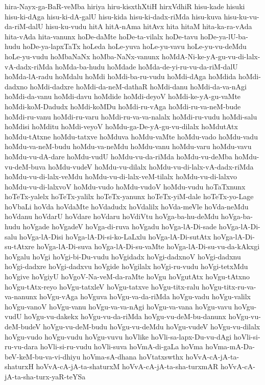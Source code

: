 {hira-Nayx-ga-BaR-veMba
hiriya
hiru-kisxthXtiH
hirxVdhiR
hisu-kade
hisuki
hisu-ki-dAga
hisu-ki-dA-galU
hisu-kida
hisu-ki-dadx-riMda
hisu-kuva
hisu-ku-vu-da-riM-dalU
hisu-ku-vudu
hitA
hitA-nAma
hitAvx
hita
hitaM
hita-ka-ra-vAda
hita-vAda
hita-vanunx
hoDe-daMte
hoDe-ta-vilalx
hoDe-tavu
hoDe-ya-lU-ba-hudu
hoDe-ya-lapxTaTx
hoLeda
hoLe-yuva
hoLe-yu-vavu
hoLe-yu-vu-deMdu
hoLe-yu-vudu
hoMbaNaNx
hoMba-NaNx-vanunx
hoMdA-Ni-ke-yA-gu-vu-di-lalx-vA-dadx-riMda
hoMda-ba-hudu
hoMdade
hoMda-de-yi-ru-vu-da-riM-dalU
hoMda-lA-radu
hoMdalu
hoMdi
hoMdi-ba-ru-vudu
hoMdi-dAga
hoMdida
hoMdi-dadxno
hoMdi-dadxre
hoMdi-da-neM-dathaR
hoMdi-danu
hoMdi-da-va-nAgi
hoMdi-da-vanu
hoMdi-davu
hoMdide
hoMdi-deyoV
hoMdi-ke-yA-gu-vaMte
hoMdi-koM-Dadudx
hoMdi-koMDu
hoMdi-ru-vAga
hoMdi-ru-va-neM-bude
hoMdi-ru-vanu
hoMdi-ru-varu
hoMdi-ru-va-va-nalalx
hoMdi-ru-vudu
hoMdi-salu
hoMdisi
hoMditu
hoMdi-veyoV
hoMdu-ga-De-yA-gu-vu-dilalx
hoMdutAtx
hoMdu-tAtxne
hoMdu-tatxve
hoMduva
hoMdu-vaMte
hoMdu-vado
hoMdu-vadu
hoMdu-va-neM-budu
hoMdu-va-neMdu
hoMdu-vanu
hoMdu-varu
hoMdu-vavu
hoMdu-vu-dA-dare
hoMdu-vudU
hoMdu-vu-da-riMda
hoMdu-vu-deMba
hoMdu-vu-deM-buva
hoMdu-vudeV
hoMdu-vu-dilalx
hoMdu-vu-di-lalx-vA-dadx-riMda
hoMdu-vu-di-lalx-veMdu
hoMdu-vu-di-lalx-veM-tilalx
hoMdu-vu-di-lalxvo
hoMdu-vu-di-lalxvoV
hoMdu-vudo
hoMdu-vudoV
hoMdu-vudu
hoTaTxnunx
hoTeTx-yalelx
hoTeTx-yalilx
hoTeTx-yanunx
hoTeTx-yiM-dale
hoTeTx-yo-Lage
hoVbaLi
hoVda
hoVdaMte
hoVdadudx
hoVdalilx
hoVda-meVle
hoVda-neMdu
hoVdanu
hoVdarU
hoVdare
hoVdaru
hoVdiVtu
hoVga-ba-hu-deMdu
hoVga-ba-hudu
hoVgade
hoVgadeV
hoVga-di-ruva
hoVgadu
hoVga-lA-Di-sade
hoVga-lA-Di-salu
hoVga-lA-Disi
hoVga-lA-Di-si-ko-LaLxlu
hoVga-lA-Di-sutAtx
hoVga-lA-Di-su-tAtxre
hoVga-lA-Di-suva
hoVga-lA-Di-su-vaMte
hoVga-lA-Di-su-vu-da-kAkxgi
hoVgalu
hoVgi
hoVgi-bi-Du-vudu
hoVgidadx
hoVgi-dadxnoV
hoVgi-dadxnu
hoVgi-dadxre
hoVgi-dadxvu
hoVgide
hoVgilalx
hoVgi-ru-vudu
hoVgi-tetxMdu
hoVgive
hoVgiyU
hoVgoV-Na-veM-da-raMte
hoVgu
hoVgutAtx
hoVgu-tAtxno
hoVgu-tAtx-reyo
hoVgu-tatxleV
hoVgu-tatxve
hoVgu-titx-ralu
hoVgu-titx-ru-va-va-nanunx
hoVgu-vAga
hoVguva
hoVgu-va-da-riMda
hoVgu-vadu
hoVgu-valilx
hoVgu-vanoV
hoVgu-vanu
hoVgu-va-va-nAgi
hoVgu-va-vana
hoVgu-vavu
hoVgu-vudU
hoVgu-vu-dakekx
hoVgu-vu-da-riMda
hoVgu-vu-deM-bu-danunx
hoVgu-vu-deM-budeV
hoVgu-vu-deM-budu
hoVgu-vu-deMdu
hoVgu-vudeV
hoVgu-vu-dilalx
hoVgu-vudo
hoVgu-vudu
hoVgu-vuvu
hoVlike
hoVli-sa-lapx-Du-vu-dAgi
hoVli-si-ru-vu-dara
hoVli-si-ru-vudu
hoVli-suva
hoVmA-di-gaLa
hoVma
hoVma-mA-Da-beV-keM-bu-va-vi-dhiyu
hoVma-sA-dhana
hoVtatxswthx
hoVvA-cA-jA-ta-shaturxH
hoVvA-cA-jA-ta-shaturxM
hoVvA-cA-jA-ta-sha-turxmAR
hoVvA-cA-jA-ta-sha-turx-yaR-teYSa
}
